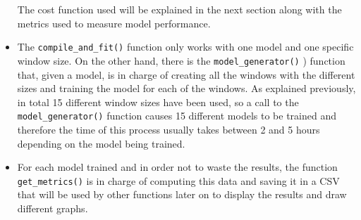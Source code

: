 \begin{itemize}
    The cost function used will be explained in the next section along with the metrics used to measure model performance.
    \newline
    
    
    \item The \small{\verb|compile_and_fit()|} \normalsize  function only works with one model and one specific window size. On the other hand, there is the \small{\verb|model_generator()|} \normalsize ) function that, given a model, is in charge of creating all the windows with the different sizes and training the model for each of the windows. As explained previously, in total 15 different window sizes have been used, so a call to the \small{\verb|model_generator()|} \normalsize  function causes 15 different models to be trained and therefore the time of this process usually takes between 2 and 5 hours depending on the model being trained.
    \newline
    
    \item For each model trained and in order not to waste the results, the function \newline \small{\verb|get_metrics()|} \normalsize  is in charge of computing this data and saving it in a CSV that will be used by other functions later on to display the results and draw different graphs.

\end{itemize}


